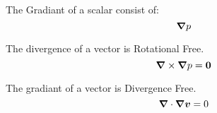 \begin{definition}
 The Gradiant of a scalar consist of:
 \begin{equation}
  {\boldsymbol \nabla} p
 \end{equation}
\end{definition}

\begin{property}
 The divergence of a vector is Rotational Free.
 \begin{equation}
  {\boldsymbol \nabla}\times {\boldsymbol \nabla} p={\boldsymbol 0}
 \end{equation}
\end{property}

\begin{property}
 The gradiant of a vector is Divergence Free.
 \begin{equation}
  {\boldsymbol \nabla}\cdot {\boldsymbol \nabla} {\boldsymbol v}=0
 \end{equation}

\end{property}

